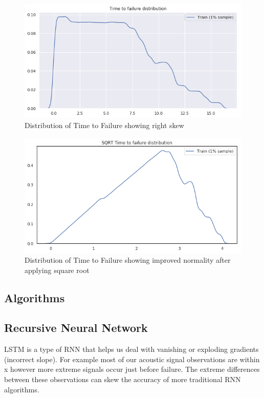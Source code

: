 \documentclass[]{llncs}
\begin{document}
\begin{figure}
	\centering
	\includegraphics[width=1\linewidth]{../GPUProject/transform1}
	\caption{Distribution of Time to Failure showing right skew}
	\label{fig:morethan90percentb}
\end{figure}

\begin{figure}
	\centering
	\includegraphics[width=1\linewidth]{../GPUProject/transform2}
	\caption{Distribution of Time to Failure showing improved normality after applying square root}
	\label{fig:morethan90percentc}
\end{figure}





\subsection{Algorithms}
\subsection{Recursive Neural Network}
LSTM is a type of RNN that helps us deal with vanishing or exploding gradients (incorrect slope). For example most of our acoustic signal observations are within x however more extreme signals occur just before failure. The extreme differences between these observations can skew the accuracy of more traditional RNN algorithms.
\end{document}

